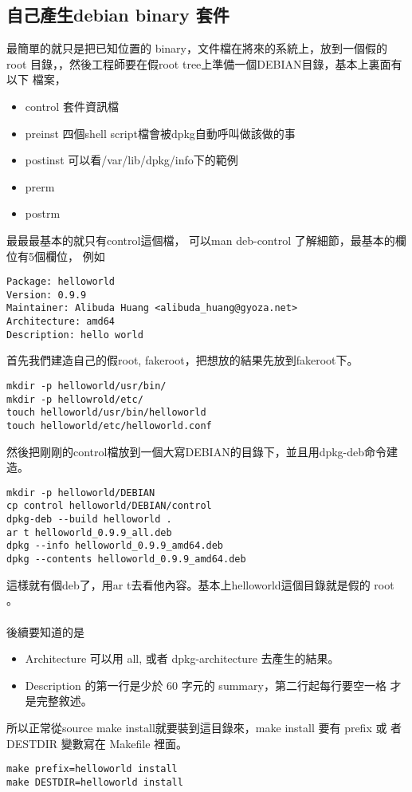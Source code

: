   \subsection{自己產生debian binary 套件}
  最簡單的就只是把已知位置的 binary，文件檔在將來的系統上，放到一個假的 root
  目錄，，然後工程師要在假root tree上準備一個DEBIAN目錄，基本上裏面有以下
  檔案，
  \begin{itemize}
    \item control   套件資訊檔
    \item preinst   四個shell script檔會被dpkg自動呼叫做該做的事
    \item postinst  可以看/var/lib/dpkg/info下的範例
    \item prerm
    \item postrm
  \end{itemize}
  最最最基本的就只有control這個檔， 可以man deb-control 了解細節，最基本的欄
  位有5個欄位， 例如
  \begin{verbatim}
Package: helloworld
Version: 0.9.9
Maintainer: Alibuda Huang <alibuda_huang@gyoza.net>
Architecture: amd64
Description: hello world
  \end{verbatim}
  首先我們建造自己的假root, fakeroot，把想放的結果先放到fakeroot下。
  \begin{verbatim}
mkdir -p helloworld/usr/bin/
mkdir -p hellowrold/etc/
touch helloworld/usr/bin/helloworld
touch helloworld/etc/helloworld.conf
  \end{verbatim}
  然後把剛剛的control檔放到一個大寫DEBIAN的目錄下，並且用dpkg-deb命令建造。
  \begin{verbatim}
mkdir -p helloworld/DEBIAN
cp control helloworld/DEBIAN/control
dpkg-deb --build helloworld .
ar t helloworld_0.9.9_all.deb
dpkg --info helloworld_0.9.9_amd64.deb
dpkg --contents helloworld_0.9.9_amd64.deb
  \end{verbatim}
  這樣就有個deb了，用ar t去看他內容。基本上helloworld這個目錄就是假的 root 。
  \\\\
  後續要知道的是
  \begin{itemize}
    \item Architecture 可以用 all, 或者 dpkg-architecture 去產生的結果。
    \item Description 的第一行是少於 60 字元的 summary，第二行起每行要空一格
      才是完整敘述。
  \end{itemize}
  所以正常從source make install就要裝到這目錄來，make install 要有 prefix 或
  者 DESTDIR 變數寫在 Makefile 裡面。
  \begin{verbatim}
make prefix=helloworld install
make DESTDIR=helloworld install
  \end{verbatim}

